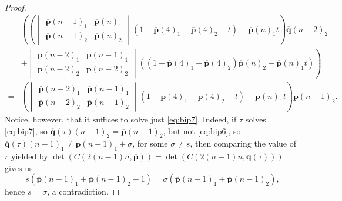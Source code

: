 \documentclass[11pt]{amsart}
\theoremstyle{definition}
\theoremstyle{remark}
\begin{document}
\begin{proof}
\begin{equation}
\begin{split}
        &\left(\left( \begin{vmatrix} \overline{\mathbf{p}}(n-1)_1 & \overline{\mathbf{p}}(n)_1 \\ \overline{\mathbf{p}}(n-1)_2 & \overline{\mathbf{p}}(n)_2 \end{vmatrix} (1-\overline{\mathbf{p}}(4)_1 - \overline{\mathbf{p}}(4)_2 -t) - \overline{\mathbf{p}}(n)_1t \right)\overline{\mathbf{q}}(n-2)_2\right.\\
        &+\left. \begin{vmatrix} \overline{\mathbf{p}}(n-2)_1 & \overline{\mathbf{p}}(n-1)_1 \\ \overline{\mathbf{p}}(n-2)_2 & \overline{\mathbf{p}}(n-2)_2 \end{vmatrix} ((1-\overline{\mathbf{p}}(4)_1-\overline{\mathbf{p}}(4)_2)\overline{\mathbf{p}}(n)_2 - \overline{\mathbf{p}}(n)_1t) \right) \\
        =& \left( \begin{vmatrix} \overline{\mathbf{p}}(n-2)_1 & \overline{\mathbf{p}}(n-1)_1 \\ \overline{\mathbf{p}}(n-2)_2 & \overline{\mathbf{p}}(n-1)_2 \end{vmatrix} (1-\overline{\mathbf{p}}(4)_1-\overline{\mathbf{p}}(4)_2-t) - \overline{\mathbf{p}}(n)_1t \right) \overline{\mathbf{p}}(n-1)_2.
    \end{split}
    \end{equation}
    Notice, however, that it suffices to solve just \cref{eq:bip7}.
    Indeed, if $\tau$ solves \cref{eq:bip7}, so $\overline{\mathbf{q}}(\tau)(n-1)_2=\overline{\mathbf{p}}(n-1)_2$, but not \cref{eq:bip6}, so $\overline{\mathbf{q}}(\tau)(n-1)_1\neq\overline{\mathbf{p}}(n-1)_1+\sigma$, for some $\sigma\neq s$, then comparing the value of $r$ yielded by $\det(C(2(n-1)n,\overline{\mathbf{p}}))=\det(C(2(n-1)n,\overline{\mathbf{q}}(\tau)))$ gives us
    \begin{equation*}
        s(\overline{\mathbf{p}}(n-1)_1+\overline{\mathbf{p}}(n-1)_2-1)=\sigma(\overline{\mathbf{p}}(n-1)_1+\overline{\mathbf{p}}(n-1)_2),
    \end{equation*}
    hence $s=\sigma$, a contradiction.


\end{proof}
\end{document}
